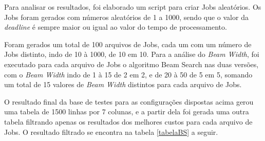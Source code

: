 \documentclass[a4paper,12pt]{article}
\begin{document}
Para analisar os resultados, foi elaborado um script para criar Jobs aleatórios. Os Jobs foram gerados com 
números aleatórios de 1 a 1000, sendo que o valor da \emph{deadline} é sempre maior ou igual ao valor do tempo 
de processamento.

Foram gerados um total de 100 arquivos de Jobs, cada um com um número de Jobs distinto, indo de 10 à 1000, de 10 em 10.
Para a análise do \emph{Beam Width}, foi executado para cada arquivo de Jobs o algoritmo Beam Search nas duas versões, 
com o \emph{Beam Width} indo de 1 à 15 de 2 em 2, e de 20 à 50 de 5 em 5, somando um total de 15 valores de 
\emph{Beam Width} distintos para cada arquivo de Jobs.

O resultado final da base de testes para as configurações dispostas acima gerou uma tabela de 1500 linhas por 7 colunas, 
e a partir dela foi gerada uma outra tabela filtrando apenas os resultados dos melhores custos para cada arquivo de Jobs.
O resultado filtrado se encontra na tabela \ref{tabelaBS} a seguir.
\end{document}

